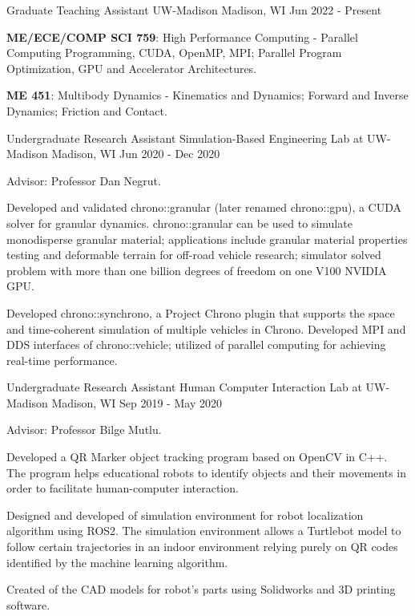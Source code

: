 \begin{cventries}
	\cventry
	{Graduate Teaching Assistant} %
	{UW-Madison} %
	{Madison, WI} %
	{Jun 2022 - Present} %
	{
		\begin{cvitems} %
			\item {\textbf{ME/ECE/COMP SCI 759}: High Performance Computing - Parallel Computing Programming, CUDA, OpenMP, MPI; Parallel Program Optimization, GPU and Accelerator Architectures.}
			\item {\textbf{ME 451}: Multibody Dynamics - Kinematics and Dynamics; Forward and Inverse Dynamics; Friction and Contact.}
		\end{cvitems}
	}
		
	

  \cventry
	{Undergraduate Research Assistant} %
	{Simulation-Based Engineering Lab at UW-Madison} %
	{Madison, WI} %
	{Jun 2020 - Dec 2020} %
	{
		\begin{cvitems} %
			\item {Advisor: Professor Dan Negrut.}
			\item {Developed and validated chrono::granular (later renamed chrono::gpu), a CUDA solver for granular dynamics. chrono::granular can be used to simulate monodisperse granular material; applications include granular material properties testing and deformable terrain for off-road vehicle research; simulator solved problem with more than one billion degrees of freedom on one V100 NVIDIA GPU.}
			\item {Developed chrono::synchrono, a Project Chrono plugin that supports the space and time-coherent simulation of multiple vehicles in Chrono. Developed MPI and DDS interfaces of chrono::vehicle; utilized of parallel computing for achieving real-time performance.}
		\end{cvitems}
	}



  \cventry
	{Undergraduate Research Assistant} %
	{Human Computer Interaction Lab at UW-Madison} %
	{Madison, WI} %
	{Sep 2019 - May 2020} %
	{
	  \begin{cvitems} %
		\item {Advisor: Professor Bilge Mutlu.}
		\item {Developed a QR Marker object tracking program based on OpenCV in C++. The program helps educational robots to identify objects and their movements in order to facilitate human-computer interaction.}
		\item {Designed and developed of simulation environment for robot localization algorithm using ROS2. The simulation environment allows a Turtlebot model to follow certain trajectories in an indoor environment relying purely on QR codes identified by the machine learning algorithm.}
		\item {Created of the CAD models for robot's parts  using Solidworks and 3D printing software.}
	  \end{cvitems}
}



\end{cventries}
